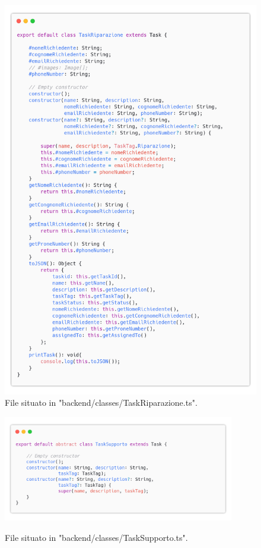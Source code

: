 \documentclass{report}
\begin{document}
\begin{figure}[H]
	\centering\includegraphics[width=1\textwidth]{images/code_task_riparazione.png}
	File situato in "backend/classes/TaskRiparazione.ts".
\end{figure}

\begin{figure}[H]
	\centering\includegraphics[width=0.9\textwidth]{images/code_task_supporto.png}

	File situato in "backend/classes/TaskSupporto.ts".
\end{figure}
\end{document}
